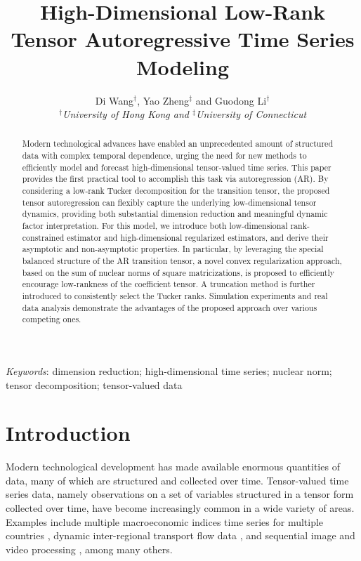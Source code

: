 \documentclass[12pt]{article}
\title{High-Dimensional Low-Rank Tensor Autoregressive Time Series Modeling}
\author{Di Wang$^{\dag}$, Yao Zheng$^\ddag$ and Guodong Li$^{\dag}$
	\\ \textit{$^{\dag}$University of Hong Kong  and  $^\ddag$University of Connecticut}}
\begin{document}
\setlength{\parindent}{16pt}

\maketitle

\begin{abstract}

  Modern technological advances have  enabled an unprecedented amount of structured data with complex temporal dependence, urging the need for new methods to efficiently model and forecast high-dimensional tensor-valued time series.
  This paper provides the  first practical tool to accomplish this task via autoregression (AR). 
  By considering a low-rank Tucker decomposition for the transition tensor, the proposed tensor autoregression can flexibly capture the underlying low-dimensional tensor dynamics, providing both substantial dimension reduction and meaningful dynamic factor interpretation.
   For this model, we introduce both  low-dimensional rank-constrained estimator and high-dimensional regularized estimators, and derive their asymptotic and non-asymptotic properties.  In particular,  by leveraging the special balanced structure of the AR transition tensor,
   a novel convex regularization approach, based on the sum of nuclear norms of square matricizations, is proposed to efficiently encourage low-rankness of the coefficient tensor. A truncation method is further introduced to consistently select the Tucker ranks. Simulation experiments and real data analysis demonstrate the advantages of the proposed approach over various competing ones.
\end{abstract}

\textit{Keywords}: dimension reduction; high-dimensional time series; nuclear norm; tensor decomposition; tensor-valued data


\newpage
\section{Introduction}
Modern technological development has made available enormous quantities of data, many of which are structured and collected over time. Tensor-valued time series data, namely observations on a set of variables structured in a tensor form collected over time, have become increasingly common in a wide variety of areas. Examples include multiple macroeconomic indices time series for multiple countries \citep{chen2019factor},  dynamic inter-regional transport flow data \citep{chen2019modeling}, and  sequential image and video processing \citep{walden2002wavelet}, among many others.
\end{document}
